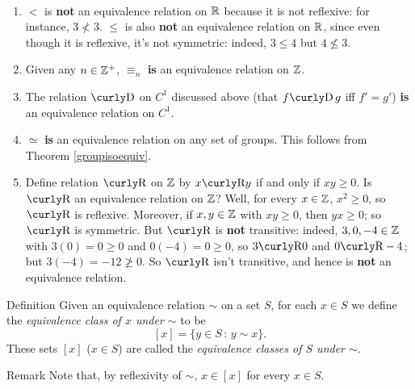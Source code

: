 \begin{example}{}\
\begin{enumerate}
\item $<$ is \textbf{not} an equivalence relation on $\mathbb{R}$ because
it is not reflexive: for instance, $3\not< 3$. $\leq$ is also \textbf{not} an equivalence relation on $\mathbb{R}$, since even though it is
reflexive, it's not symmetric: indeed, $3\leq 4$ but $4\not\leq 3$.

\item Given any $n\in \mathbb{Z}^+$, $\equiv_n$ \textbf{is} an equivalence relation on $\mathbb{Z}$.  

\item The relation $\D$ on $C^1$ discussed above (that
    $f\D\, g$ iff $f'=g'$) \textbf{is} an equivalence relation
    on $C^1$.

\item $\simeq$ \textbf{is} an equivalence relation on any set of
groups. This follows from Theorem \ref{groupisoequiv}.

\item Define relation $\R$ on $\mathbb{Z}$ by $x\R y$ if and only if $xy
\geq 0$.  Is $\R$ an equivalence relation on $\mathbb{Z}$?  Well, for every
$x\in \mathbb{Z}$, $x^2\geq 0$, so $\R$ is reflexive.  Moreover, if $x,y\in
\mathbb{Z}$ with $xy \geq 0$, then $yx \geq 0$; so $\R$ is symmetric.  But
$\R$ is \textbf{not} transitive: indeed, $3,0,-4\in \mathbb{Z}$ with $3(0)=0
\geq 0$ and $0(-4)=0\geq 0$, so $3\R 0$ and $0 \R -4$; but
$3(-4)=-12 \not \geq 0$.  So $\R$ isn't transitive, and hence is
\textbf{not} an equivalence relation. \end{enumerate}
\end{example}

\begin{df}{Definition} Given an equivalence relation $\sim$ on a set $S$, for
each $x\in S$ we define the \textit{equivalence class of $x$ under
$\sim$} to be
$$[x]=\{y\in S\,:\, y\sim x\}.$$ These sets $[x]$ ($x\in S$) are
called the \textit{equivalence classes of $S$ under $\sim$}.\end{df}
\begin{comment}the set of distinct equivalence classes of $S$ under
$\sim$ is typically denoted by $S/ \sim$.\end{comment}

\begin{df}{Remark} Note that, by reflexivity of $\sim$, $x\in [x]$
for every $x\in S$.\end{df}



